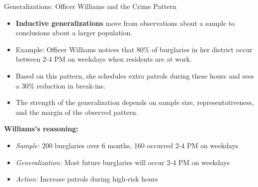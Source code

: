 \documentclass{beamer}
\begin{document}

\begin{frame}{Generalizations: Officer Williams and the Crime Pattern}
	\begin{itemize}
		\item \textbf{Inductive generalizations} move from observations about a sample to conclusions about a larger population.
		\item Example: Officer Williams notices that 80\% of burglaries in her district occur between 2-4 PM on weekdays when residents are at work.
		\item Based on this pattern, she schedules extra patrols during these hours and sees a 30\% reduction in break-ins.
		\item The strength of the generalization depends on sample size, representativeness, and the margin of the observed pattern.
	\end{itemize}
	
	\begin{example}
		\textbf{Williams's reasoning:}
		\begin{itemize}
			\item \textit{Sample:} 200 burglaries over 6 months, 160 occurred 2-4 PM on weekdays
			\item \textit{Generalization:} Most future burglaries will occur 2-4 PM on weekdays
			\item \textit{Action:} Increase patrols during high-risk hours
		\end{itemize}
	\end{example}
	\end{frame}
\end{document}
